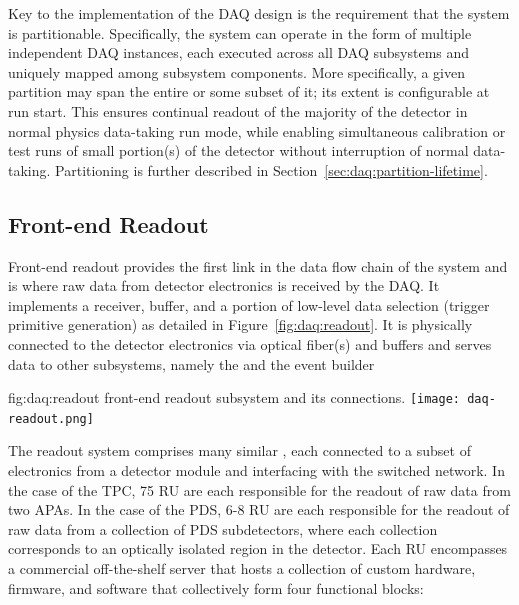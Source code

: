 Key to the implementation of the DAQ design is the requirement that
the system is partitionable. Specifically, the system can operate in
the form of multiple independent DAQ instances, each 
executed across all DAQ subsystems and uniquely mapped among subsystem components. 
More specifically, a given partition may span the entire %
 or some subset of it; its extent is configurable at
run start. This ensures continual readout of the
majority of the detector in normal physics data-taking run mode, while
enabling simultaneous calibration or test runs of small portion(s) of the
detector without interruption of normal data-taking. 
Partitioning is further described in Section~\ref{sec:daq:partition-lifetime}.

\subsection{Front-end Readout}
\label{sec:daq:design-readout}

Front-end readout provides the first link in the data flow chain of
the  system and is where raw data from detector electronics
is received by the DAQ.
It implements a receiver, buffer, and a portion of low-level data
selection (trigger primitive generation) as detailed in Figure~\ref{fig:daq:readout}.
It is physically connected to the detector electronics via optical fiber(s) and buffers and serves data to other  subsystems, namely the  and the event builder


\begin{dunefigure}{fig:daq:readout}{  front-end
    readout subsystem and its connections.}
  \texttt{[image: daq-readout.png]}
\end{dunefigure}


The readout system comprises many similar , each
connected to a subset of electronics from a detector module and
interfacing with the  switched network. In the case of the
TPC, 75 RU are each responsible for the readout of raw data from two
APAs. In the case of the PDS, 6-8 RU are each responsible for the
readout of raw data from a collection of PDS subdetectors, where each
collection corresponds to an optically isolated region in the
detector. 
Each RU encompasses a commercial off-the-shelf server that hosts a
collection of custom hardware, 
firmware, and software that collectively form four functional blocks:

